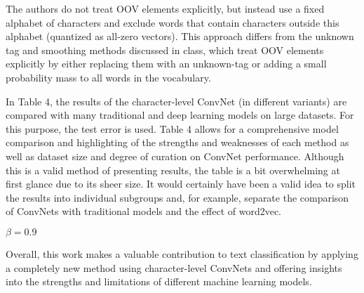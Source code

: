 \documentclass[12pt]{article}
\begin{document}
The authors do not treat OOV elements explicitly, but instead use a fixed alphabet of characters and exclude words that contain characters outside this alphabet (quantized as all-zero vectors). This approach differs from the unknown tag and smoothing methods discussed in class, which treat OOV elements explicitly by either replacing them with an unknown-tag or adding a small probability mass to all words in the vocabulary.

In Table 4, the results of the character-level ConvNet (in different variants) are compared with many traditional and deep learning models on large datasets. For this purpose, the test error is used. Table 4 allows for a comprehensive model comparison and highlighting of the strengths and weaknesses of each method as well as dataset size and degree of curation on ConvNet performance. Although this is a valid method of presenting results, the table is a bit overwhelming at first glance due to its sheer size. It would certainly have been a valid idea to split the results into individual subgroups and, for example, separate the comparison of ConvNets with traditional models and the effect of word2vec.

$\beta = 0.9$

Overall, this work makes a valuable contribution to text classification by applying a completely new method using character-level ConvNets and offering insights into the strengths and limitations of different machine learning models.
\end{document}
